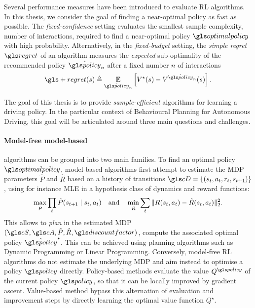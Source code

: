 Several performance measures have been introduced to evaluate \gls{RL} algorithms. In this thesis, we consider the goal of finding a near-optimal policy as fast as possible. The \emph{fixed-confidence} setting evaluates the smallest sample complexity, \ie number of interactions, required to find a near-optimal policy $\optimalpolicy$ with high probability. Alternatively, in the \emph{fixed-budget} setting, the \emph{simple regret} $\regret$ of an algorithm measures the \emph{expected} sub-optimality of the recommended policy $\hat{\policy}_n$ after a fixed number $n$ of interactions
\begin{equation*}
\gls+{regret}(s) \eqdef \expectedvalue_{\hat{\policy}_n} \left[ V^\star(s) - V^{\hat{\policy}_n}(s) \right].
\end{equation*}


The goal of this thesis is to provide \emph{sample-efficient} algorithms for learning a driving policy. In the particular context of Behavioural Planning for Autonomous Driving, this goal will be articulated around three main questions and challenges.

\paragraph{Model-free \vs model-based}

 algorithms can be grouped into two main families. 
To find an optimal policy $\optimalpolicy$, model-based  algorithms first attempt to estimate the \gls{MDP} parameters $\hat{P}$ and $\hat{R}$ based on a history of transitions $\cD = \{(s_{t},a_t, r_t, s_{t+1})\}$, using for instance \gls{MLE} in a hypothesis class of dynamics and reward functions:
\begin{equation*}
\max_{\hat{P}} \prod_{t}\hat{P}\lparen s_{t+1} \mid s_t,a_t\rparen \quad \text{and} \quad \min_{\hat{R}} \sum_{t}\|R(s_t,a_t) - \hat{R}(s_t,a_t)\|^2_2.
\end{equation*}
This allows to \emph{plan} in the estimated \gls{MDP} $(\cS,\cA, \hat{P}, \hat{R}, \discount)$, \ie compute the associated optimal policy $\hat{\policy}^\star$. This can be achieved using planning algorithms such as Dynamic Programming or Linear Programming.
Conversely, model-free \gls{RL} algorithms do not estimate the underlying \gls{MDP} and aim instead to optimise a policy $\policy$ directly. Policy-based methods evaluate the value $Q^\policy$ of the current policy $\policy$, so that it can be locally improved \eg by gradient ascent. Value-based method bypass this alternation of evaluation and improvement steps by directly learning the optimal value function $Q^\star$.

